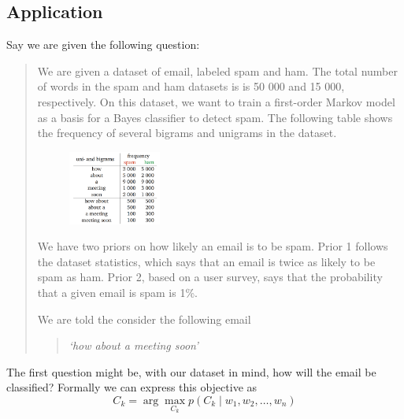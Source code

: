 \documentclass[12pt]{article}
\begin{document}
\subsection{Application}



Say we are given the following question:
\begin{quote}
    We are given a dataset of email, labeled spam and ham. The total number of words in the spam and ham datasets is is 50 000 and 15 000, respectively. On this dataset, we want to train a first-order Markov model as a basis for a Bayes classifier to detect spam. The following table shows the frequency of several bigrams and unigrams in the dataset.

    \begin{figure}[!h]
        \centering
        \includegraphics[width=0.3\textwidth]{assets/ft1.png}
    \end{figure}

    We have two priors on how likely an email is to be spam. Prior 1 follows the dataset statistics, which says that an email is twice as likely to be spam as ham. Prior 2, based on a user survey, says that the probability that a given email is spam is 1\%.
    
    \smallskip
    We are told the consider the following email
    \begin{quote}
        \textit{`how about a meeting soon'}
    \end{quote}
\end{quote}
The first question might be, with our dataset in mind, how will the email be classified? Formally we can express this objective as 
\[
    C_k = \arg\max_{C_k}p(C_k\mid w_1, w_2, \ldots, w_n)
\]
\end{document}
